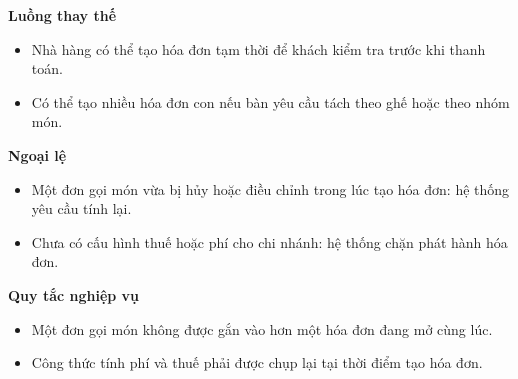 \documentclass[11pt,a4paper]{article}
\begin{document}
\begin{usecasebox}[title={UC-BIL-01 --- Tạo hóa đơn cho bàn}]
    \textbf{Luồng thay thế}
    \begin{itemize}[leftmargin=1.8em]
  \item Nhà hàng có thể tạo hóa đơn tạm thời để khách kiểm tra trước khi thanh toán.
  \item Có thể tạo nhiều hóa đơn con nếu bàn yêu cầu tách theo ghế hoặc theo nhóm món.
\end{itemize}

    \textbf{Ngoại lệ}
    \begin{itemize}[leftmargin=1.8em]
  \item Một đơn gọi món vừa bị hủy hoặc điều chỉnh trong lúc tạo hóa đơn: hệ thống yêu cầu tính lại.
  \item Chưa có cấu hình thuế hoặc phí cho chi nhánh: hệ thống chặn phát hành hóa đơn.
\end{itemize}

    \textbf{Quy tắc nghiệp vụ}
    \begin{itemize}[leftmargin=1.8em]
  \item Một đơn gọi món không được gắn vào hơn một hóa đơn đang mở cùng lúc.
  \item Công thức tính phí và thuế phải được chụp lại tại thời điểm tạo hóa đơn.
\end{itemize}
    \end{usecasebox}
\end{document}
